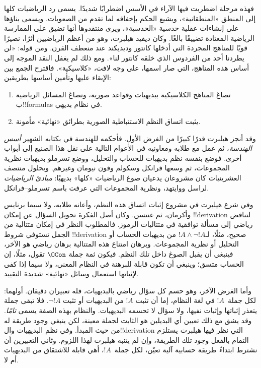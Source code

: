 \documentclass[../../../include/open-logic-section]{subfiles}
\begin{document}
فهذه مرحلة اضطربت فيها الآراء في الأسس اضطرابًا شديدًا.
يسمى رد الرياضيات كلها إلى المنطق «المنطقانية»، ويشيع الحكم
بإخفاقه لما تقدم من الصعوبات. ويسمى بناؤها على إنشاءات
عقلية حدسية «الحدسية»، ويرى منتقدوها أنها تضيق على الممارسة
الرياضية المعتادة تضييقًا بالغًا. وكان ديفيد هيلبرت، وهو
من أعظم الرياضيين أثرًا، نصيرًا قويًا للمناهج المجردة التي
أدخلها كانتور وديديكند عند منعطف القرن. ومن قوله:
«لن يطردنا أحد من الفردوس الذي خلقه كانتور لنا».
ومع ذلك لم يغفل النقد الموجه إلى أساس هذه المناهج، التي
صار اسمها، على وجه لافت، «كلاسيكية». فاقترح الجمع بين
الإبقاء عليها وتأمين أساسها بطريقين:
\begin{enumerate}
\item تصاغ المناهج الكلاسيكية ببديهيات وقواعد صورية، وتصاغ
  المسائل الرياضية ب!!{formula}s في نظام بديهي.
\item يثبت اتساق النظم الاستنباطية الصورية بطرائق «نهائية»
  مأمونة.
\end{enumerate}

وقد أنجز هيلبرت قدرًا كبيرًا من الغرض الأول. فأحكمه للهندسة
في  بكتابه الشهير \emph{أسس الهندسة}، ثم عمل مع طلابه
ومعاونيه في الأعوام التالية على نقل هذا الصنيع إلى أبواب
أخرى. فوضع بنفسه نظم بديهيات للحساب والتحليل، ووضع تسرملو
بديهيات نظرية المجموعات، ثم وسعها فرانكل وسكولم وفون نيومان
وغيرهم. وبحلول منتصف العشرينيات كان مشروعان يدعيان صوغ
الرياضيات «كلها» بديهيًا: \emph{مبادئ الرياضيات} لراسل
ووايتهد، ونظرية المجموعات التي عرفت باسم تسرملو--فرانكل.

وفي  شرع هيلبرت في مشروع إثبات اتساق هذه النظم،
وأعانه طلابه، ولا سيما برنايس وأكرمان، ثم غنتسن.
وكان أصل الفكرة تحويل السؤال عن إمكان !!{derivation}
لتناقض رياضي إلى مسألة توافقية في متتاليات الرموز.
فالمطلوب النظر في إمكان متتالية من الجمل تستوفي شروط
!!{derivation} صحيح، مثلًا، لـ$!A\land\lnot !A$ من
بديهيات الحساب أو التحليل أو نظرية المجموعات. وبرهان امتناع
هذه المتتالية برهان رياضي هو الآخر، فينبغي أن يقبل الصوغ
داخل تلك النظم. فيكون ثمة جملة $\OCon$ تقول، مثلًا،
إن الحساب متسق؛ وينبغي أن تكون قابلة للبرهنة في النظام
المعني، ولا سيما إذا كفى لإثباتها استعمال وسائل «نهائية»
شديدة التقييد.

وأما الغرض الآخر، وهو حسم كل سؤال رياضي بالبديهيات،
فله تعبيران دقيقان. أولهما: لكل جملة~$!A$ في لغة النظام،
إما أن تثبت $!A$ من البديهيات أو تثبت $\lnot !A$.
فلا تبقى جملة يتعذر إثباتها وإثبات نفيها، ولا سؤال لا
تحسمه البديهيات. والنظام بهذه الصفة يسمى \emph{تامًا}.
وقد يشق مع ذلك تعيين أي البديلين هو الثابت لجملة معينة،
لكن ينبغي وجود طريقة له من حيث المبدأ. وفي نظم البديهيات
وال!!{derivation} التي نظر فيها هيلبرت يستلزم التمام
بالفعل وجود تلك الطريقة، وإن لم يتنبه هيلبرت لهذا اللزوم.
وثاني التعبيرين أن نشترط ابتداءً طريقة حسابية آلية تعيّن،
لكل جملة~$!A$، أهي قابلة للاشتقاق من البديهيات أم لا.
\end{document}
